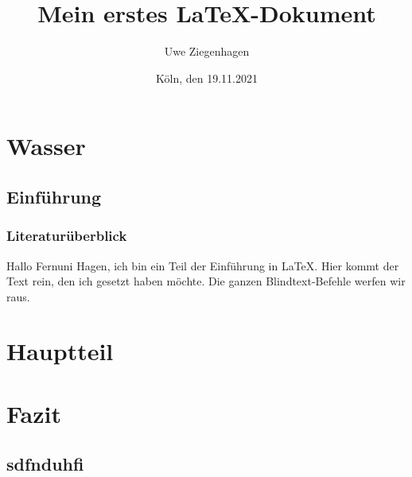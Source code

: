 \documentclass[12pt,ngerman,parskip=full]{scrbook}
\author{Uwe Ziegenhagen}
\title{Mein erstes \LaTeX-Dokument}
\date{Köln, den 19.11.2021}
\begin{document}
\maketitle

\tableofcontents

\chapter{Wasser}

\section{Einführung}
\subsection{Literaturüberblick}

Hallo Fernuni Hagen, ich bin ein Teil der Einführung in \LaTeX. Hier kommt der Text rein, den ich gesetzt haben möchte. Die ganzen Blindtext-Befehle werfen wir raus.



\chapter{Hauptteil}

\blindtext[2]  

\blindtext[2]  

\blindtext[2]  

\chapter{Fazit}

\section{sdfnduhfi}

\blindtext[2]  

\blindtext[2]  

\blindtext[2]  
\end{document}
